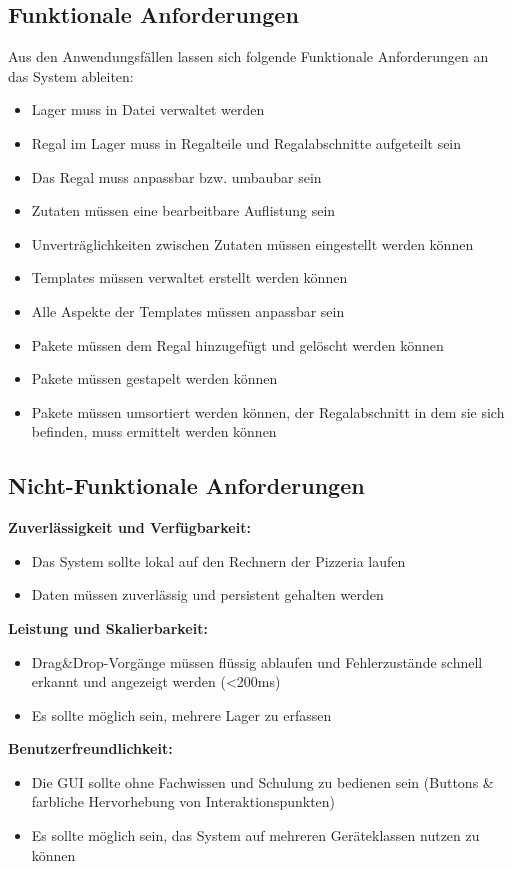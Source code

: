 \subsection{Funktionale Anforderungen}
Aus den Anwendungsfällen lassen sich folgende Funktionale Anforderungen an das System ableiten:
\begin{itemize}
  \item Lager muss in Datei verwaltet werden
  \item Regal im Lager muss in Regalteile und Regalabschnitte aufgeteilt sein
  \item Das Regal muss anpassbar bzw. umbaubar sein
  \item Zutaten müssen eine bearbeitbare Auflistung sein
  \item Unverträglichkeiten zwischen Zutaten müssen eingestellt werden können
  \item Templates müssen verwaltet erstellt werden können
  \item Alle Aspekte der Templates müssen anpassbar sein
  \item Pakete müssen dem Regal hinzugefügt und gelöscht werden können
  \item Pakete müssen gestapelt werden können
  \item Pakete müssen umsortiert werden können, der Regalabschnitt in dem sie sich befinden, muss ermittelt werden können
\end{itemize}
\subsection{Nicht-Funktionale Anforderungen}
\textbf{Zuverlässigkeit und Verfügbarkeit:}
\begin{itemize}
  \item Das System sollte lokal auf den Rechnern der Pizzeria laufen
  \item Daten müssen zuverlässig und persistent gehalten werden
\end{itemize}
\textbf{Leistung und Skalierbarkeit:}
\begin{itemize}
  \item Drag\&Drop-Vorgänge müssen flüssig ablaufen und Fehlerzustände schnell erkannt und angezeigt werden (\textless 200ms) 
  \item Es sollte möglich sein, mehrere Lager zu erfassen
\end{itemize}
\textbf{Benutzerfreundlichkeit:}
\begin{itemize}
  \item Die GUI sollte ohne Fachwissen und Schulung zu bedienen sein (Buttons \& farbliche Hervorhebung von Interaktionspunkten) 
  \item Es sollte möglich sein, das System auf mehreren Geräteklassen nutzen zu können
\end{itemize}